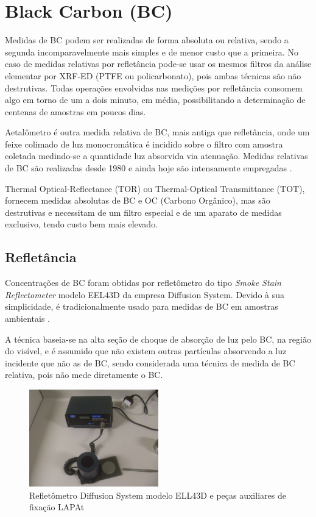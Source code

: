 \section{Black Carbon (BC)}

Medidas de BC podem ser realizadas de forma absoluta ou relativa, sendo a 
segunda incomparavelmente mais simples e de menor custo que a primeira. 
No caso de medidas relativas por refletância pode-se usar os mesmos filtros 
da análise elementar por XRF-ED (PTFE ou policarbonato), pois ambas técnicas são 
não destrutivas. Todas operações envolvidas nas medições por refletância 
consomem algo em torno de um a dois minuto, em média, possibilitando a 
determinação de centenas de amostras em poucos dias.

Aetalômetro é outra medida relativa de BC, mais antiga que refletância,
onde um feixe colimado de luz monocromática é incidido sobre o
filtro com amostra coletada medindo-se a quantidade luz absorvida via 
atenuação. Medidas relativas de BC são realizadas desde 1980 e ainda hoje são 
intensamente empregadas \citep{targino2016}.

Thermal Optical-Reflectance (TOR) ou 
Thermal-Optical Transmittance (TOT), fornecem medidas absolutas de BC e OC
(Carbono Orgânico), mas são destrutivas e necessitam de um filtro especial e 
de um aparato de medidas exclusivo, tendo custo bem mais elevado.

\subsection{Refletância}

Concentrações de BC foram obtidas por refletômetro do tipo 
\textit{Smoke Stain Reflectometer} modelo EEL43D da empresa Diffusion System.
Devido à sua simplicidade, é tradicionalmente usado para medidas de BC em 
amostras ambientais \citep{lack2014}. 

A técnica baseia-se na alta seção de choque de absorção de luz pelo BC, 
na região do visível, e é assumido que não existem outras 
partículas absorvendo a luz incidente que não as de BC, sendo considerada 
uma técnica de medida de BC relativa, pois não mede diretamente o BC. 

\begin{figure}[H]
  \centering
  \includegraphics[width=0.5\textwidth]{../inputs/images/refletometro.jpg}
  \caption{Refletômetro Diffusion System modelo ELL43D 
           e peças auxiliares de fixação LAPAt}
\end{figure}


